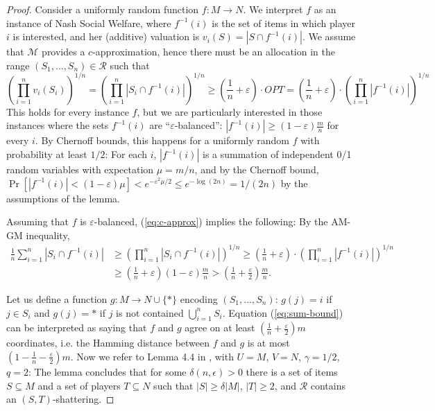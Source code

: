 \documentclass{article}
\newcommand{\eps}{\varepsilon}
\newcommand{\cM}{{\mathcal M}}
\newcommand{\cR}{{\mathcal R}}
\begin{document}
\begin{proof}
Consider a uniformly random function $f:M \to N$. We interpret $f$ as an instance of Nash Social Welfare, where $f^{-1}(i)$ is the set of items in which player $i$ is interested, and her (additive) valuation is $v_i(S) = |S \cap f^{-1}(i)|$. 
We assume that $\cM$ provides a $c$-approximation, hence there must be an allocation in the range $(S_1,\ldots,S_n) \in \cR$ such that
\begin{equation}
\label{eq:c-approx}
 \left( \prod_{i=1}^{n} v_i(S_i) \right)^{1/n} = \left( \prod_{i=1}^{n} |S_i \cap f^{-1}(i)| \right)^{1/n}
 \geq \left( \frac{1}{n} + \eps \right) \cdot OPT = \left( \frac{1}{n} + \eps \right) \cdot \left( \prod_{i=1}^{n} |f^{-1}(i)| \right)^{1/n}
\end{equation}
This holds for every instance $f$, but we are particularly interested in those instances where the sets $f^{-1}(i)$ are ``$\eps$-balanced'': $|f^{-1}(i)| \geq (1-\eps) \frac{m}{n}$ for every $i$. By Chernoff bounds, this happens for a uniformly random $f$ with probability at least $1/2$:
For each $i$, $|f^{-1}(i)|$ is a summation of independent 0/1 random variables with expectation $\mu = m/n$, and by the Chernoff bound, $\Pr[|f^{-1}(i)| < (1-\eps) \mu] < e^{-\eps^2 \mu / 2} \leq e^{-\log (2n)} = 1/(2n)$ by the assumptions of the lemma.

Assuming that $f$ is $\eps$-balanced, (\ref{eq:c-approx}) implies the following: By the AM-GM inequality,
\begin{align}
\label{eq:sum-bound}
\frac{1}{n} \sum_{i=1}^{n} |S_i \cap f^{-1}(i)| &\geq  \left( \prod_{i=1}^{n} |S_i \cap f^{-1}(i)| \right)^{1/n}
 \geq \left( \frac{1}{n} + \eps \right) \cdot \left( \prod_{i=1}^{n} |f^{-1}(i)| \right)^{1/n}\nonumber \\
  &\geq   \left( \frac{1}{n} + \eps \right) (1-\eps) \frac{m}{n} > \left( \frac{1}{n} + \frac{\eps}{2} \right) \frac{m}{n}.
\end{align}

Let us define a function $g:M \to N \cup \{*\}$ encoding $(S_1,\ldots,S_n)$: $g(j) = i$ if $j \in S_i$ and $g(j) = *$ if $j$ is not contained $\bigcup_{i=1}^{n} S_i$. Equation (\ref{eq:sum-bound}) can be interpreted as saying that $f$ and $g$ agree on at least $\left( \frac{1}{n} + \frac{\eps}{2} \right) m$ coordinates, i.e. the Hamming distance between $f$ and $g$ is at most $(1 - \frac{1}{n} - \frac{\eps}{2}) m$. Now we refer to Lemma 4.4 in \cite{BDFK10}, with $U=M$, $V=N$, $\gamma = 1/2$, $q=2$:  The lemma concludes that for some $\delta(n,\epsilon)>0$ there is a set of items $S \subseteq M$ and a set of players $T \subseteq N$ such that $|S| \geq \delta |M|$, $|T| \geq 2$, and $\cR$ contains an $(S,T)$-shattering.
\end{proof}
\end{document}
